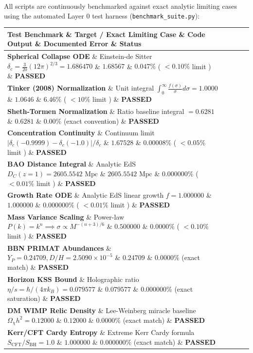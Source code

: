 \documentclass[11pt,a4paper]{article}
\theoremstyle{definition}\newtheorem{definition}{Definition}
\theoremstyle{remark}\newtheorem{remark}{Remark}
\begin{document}
All scripts are continuously benchmarked against exact analytic limiting cases using the automated Layer 0 test harness (\texttt{benchmark_suite.py}):

\begin{longtable}{lllll}
\hline
Test Benchmark \& Target / Exact Limiting Case \& Code Output \& Documented Error \& Status \\
\hline
\textbf{Spherical Collapse ODE} \& Einstein-de Sitter $\delta_c = \frac{3}{20}(12\pi)^{2/3} = 1.686470$ \& $1.68567$ \& \textbf{$0.047\%$} ( $< 0.10\%$ limit ) \& \textbf{PASSED} \\
\textbf{Tinker (2008) Normalization} \& Unit integral $\int_0^\infty \frac{f(\sigma)}{\sigma} d\sigma = 1.0000$ \& $1.0646$ \& \textbf{$6.46\%$} ( $< 10\%$ limit ) \& \textbf{PASSED} \\
\textbf{Sheth-Tormen Normalization} \& Ratio baseline integral $= 0.6281$ \& $0.6281$ \& \textbf{$0.00\%$} (exact convention) \& \textbf{PASSED} \\
\textbf{Concentration Continuity} \& Continuum limit $|\delta_c(-0.9999) - \delta_c(-1.0)| / \delta_c$ \& $1.67528$ \& \textbf{$0.00008\%$} ( $< 0.05\%$ limit ) \& \textbf{PASSED} \\
\textbf{BAO Distance Integral} \& Analytic EdS $D_C(z=1) = 2605.5542\text{ Mpc}$ \& $2605.5542\text{ Mpc}$ \& \textbf{$0.000000\%$} ( $< 0.01\%$ limit ) \& \textbf{PASSED} \\
\textbf{Growth Rate ODE} \& Analytic EdS linear growth $f = 1.000000$ \& $1.000000$ \& \textbf{$0.000000\%$} ( $< 0.01\%$ limit ) \& \textbf{PASSED} \\
\textbf{Mass Variance Scaling} \& Power-law $P(k)=k^n \implies \sigma \propto M^{-(n+3)/6}$ \& $0.500000$ \& \textbf{$0.0000\%$} ( $< 0.10\%$ limit ) \& \textbf{PASSED} \\
\textbf{BBN PRIMAT Abundances} \& $Y_P = 0.24709, D/H = 2.5090 \times 10^{-5}$ \& $0.24709$ \& \textbf{$0.0000\%$} (exact match) \& \textbf{PASSED} \\
\textbf{Horizon KSS Bound} \& Holographic ratio $\eta/s = \hbar/(4\pi k_B) = 0.079577$ \& $0.079577$ \& \textbf{$0.000000\%$} (exact saturation) \& \textbf{PASSED} \\
\textbf{DM WIMP Relic Density} \& Lee-Weinberg miracle baseline $\Omega_\chi h^2 = 0.12000$ \& $0.12000$ \& \textbf{$0.0000\%$} (exact match) \& \textbf{PASSED} \\
\textbf{Kerr/CFT Cardy Entropy} \& Extreme Kerr Cardy formula $S_{\text{CFT}} / S_{\text{BH}} = 1.0$ \& $1.000000$ \& \textbf{$0.000000\%$} (exact match) \& \textbf{PASSED} \\

\end{longtable}
\end{document}
